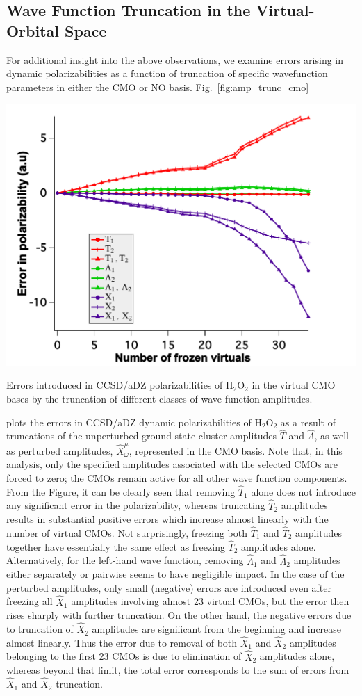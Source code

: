 \subsection{Wave Function Truncation in the Virtual-Orbital Space}

For additional insight into the above observations, we examine errors arising
in dynamic polarizabilities as a function of truncation of specific
wavefunction parameters in either the CMO or NO basis.
Fig.~\ref{fig:amp_trunc_cmo} 
\begin{MyFigure}[h!]
\centering
\includegraphics[width=0.6\linewidth,natwidth=610,natheight=642]{figures_fvno/amp_trunc_cmo.pdf}
\caption{{\footnotesize Errors introduced in CCSD/aDZ polarizabilities of
H$_2$O$_2$ in the virtual CMO bases by the truncation of different classes of wave
function amplitudes.}}
\label{fig:amp_trunc_cmo}
\end{MyFigure}
plots the errors in CCSD/aDZ dynamic polarizabilities of H$_2$O$_2$ as a result of truncations of the unperturbed
ground-state cluster amplitudes $\hat{T}$ and $\hat{\Lambda}$, as well as
perturbed amplitudes, $\hat{X}_\omega^\mu$, represented in the CMO basis.
Note that, in this analysis, only the specified amplitudes associated with the
selected CMOs are forced to zero; the CMOs remain active for all other wave
function components.  From the Figure, it can be clearly seen that removing
$\hat{T}_1$ alone does not introduce any significant error in the
polarizability, whereas truncating $\hat{T}_2$ amplitudes results in
substantial positive errors which increase almost linearly with the number of
virtual CMOs. Not surprisingly, freezing both $\hat{T}_1$ and $\hat{T}_2$
amplitudes together have essentially the same effect as freezing $\hat{T}_2$
amplitudes alone. Alternatively, for the left-hand wave function, removing
$\hat{\Lambda}_1$ and $\hat{\Lambda}_2$ amplitudes either separately or
pairwise seems to have negligible impact.  In the case of the perturbed
amplitudes, only small (negative) errors are introduced even after freezing
all $\hat{X}_1$ amplitudes involving almost 23 virtual CMOs, but the error
then rises sharply with further truncation.  On the other hand, the negative
errors due to truncation of $\hat{X}_2$ amplitudes are significant from the
beginning and increase almost linearly.  Thus the error due to removal of both
$\hat{X}_1$ and $\hat{X}_2$ amplitudes belonging to the first 23 CMOs is due
to elimination of $\hat{X}_2$ amplitudes alone, whereas beyond that limit, the
total error corresponds to the sum of errors from $\hat{X}_1$ and $\hat{X}_2$
truncation.

